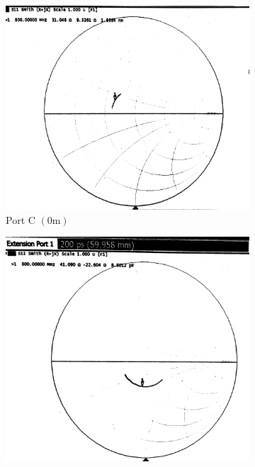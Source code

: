 \documentclass[10pt]{article}
\begin{document}
\begin{figure}[ht]
  \centering
  \begin{subfigure}[b]{0.45\textwidth}
      \includegraphics[width=\textwidth]{../photos/lab3/load_as_is.jpg}
      \caption{Port C $(0\text{m})$}
  \end{subfigure}
  \quad
  \begin{subfigure}[b]{0.45\textwidth}
    \includegraphics[width=\textwidth]{../photos/lab3/load_deembedded.jpg}

\end{subfigure}
\end{figure}
\end{document}
